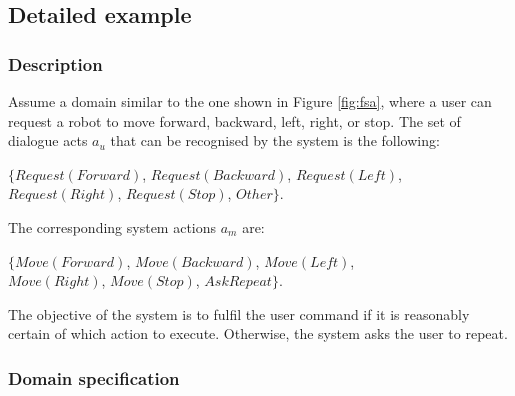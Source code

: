 \subsection{Detailed example}

\subsubsection*{Description}

Assume a domain similar to the one shown in Figure \ref{fig:fsa}, where a user can request a robot to move forward, backward, left, right, or stop.  The set of dialogue acts $a_u$ that can be recognised by the system is the following: 
\begin{center}
$\{\mathit{Request(Forward)}$, $\mathit{Request(Backward)}$, $\mathit{Request(Left)}$, \\ $\mathit{Request(Right)}$, $\mathit{Request(Stop)}$, $\mathit{Other}\}$. \\
\end{center}
The corresponding system actions $a_m$ are: 
\begin{center}
$\{\mathit{Move(Forward)}$, $\mathit{Move(Backward)}$, $\mathit{Move(Left)}$, \\ $\mathit{Move(Right)}$, $\mathit{Move(Stop)}$, $\mathit{AskRepeat}\}$. 
\end{center}
The objective of the system is to fulfil the user command if it is reasonably certain of which action to execute.  Otherwise, the system asks the user to repeat. 

\subsubsection*{Domain specification}


